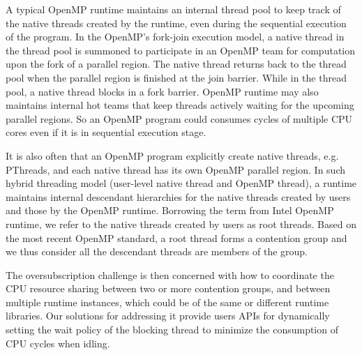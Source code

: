 
A typical OpenMP runtime maintains 
an internal thread pool to keep track of the native threads created by the runtime, 
even during the sequential execution of the program. 
In the OpenMP's fork-join execution model, a native thread in the thread pool 
is summoned to participate in an OpenMP team for computation upon the fork of a {\sf parallel} region. 
The native thread returns back to the thread pool when the {\sf parallel} 
region is finished at the join barrier. While in the 
thread pool, a native thread blocks in a fork barrier. 
OpenMP runtime may also
maintains internal hot teams that keep threads actively waiting for the upcoming {\sf parallel} regions. 
So an OpenMP program could consumes cycles of multiple CPU cores even if it is in sequential execution stage.

It is also often that an OpenMP program explicitly create native threads, e.g. PThreads, and each native thread has
its own OpenMP {\sf parallel} region. 
In such hybrid threading model (user-level native thread and OpenMP thread), 
a runtime maintains internal descendant hierarchies for the native threads created by users and
those by the OpenMP runtime. Borrowing the term from Intel OpenMP runtime, we refer to 
the native threads created by users as root threads. 
Based on the most recent OpenMP standard, a root thread forms a contention group and we thus 
consider all the descendant threads are members of the group. 


The oversubscription challenge is then concerned with how 
to coordinate the CPU resource sharing between two or more contention groups, and between multiple 
runtime instances, which could be of the same or different runtime libraries. 
Our solutions for addressing it provide users APIs for 
dynamically setting the wait policy of the blocking thread to minimize 
the consumption of CPU cycles when idling. 


